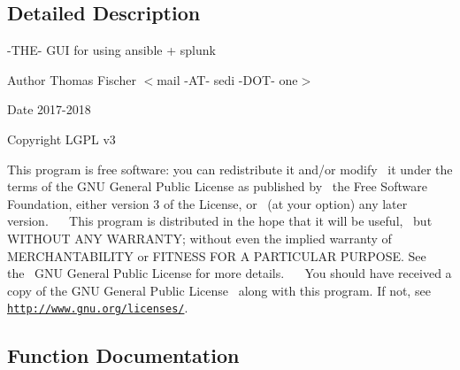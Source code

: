 \subsection{Detailed Description}
-\/\+T\+H\+E-\/ G\+UI for using ansible + splunk 

\begin{DoxyAuthor}{Author}
Thomas Fischer $<$mail -\/\+A\+T-\/ sedi -\/\+D\+O\+T-\/ one$>$ 
\end{DoxyAuthor}
\begin{DoxyDate}{Date}
2017-\/2018 
\end{DoxyDate}
\begin{DoxyCopyright}{Copyright}
L\+G\+PL v3
\end{DoxyCopyright}
This program is free software\+: you can redistribute it and/or modify~\newline
 it under the terms of the G\+NU General Public License as published by~\newline
 the Free Software Foundation, either version 3 of the License, or~\newline
 (at your option) any later version.~\newline
 ~\newline
 This program is distributed in the hope that it will be useful,~\newline
 but W\+I\+T\+H\+O\+UT A\+NY W\+A\+R\+R\+A\+N\+TY; without even the implied warranty of~\newline
 M\+E\+R\+C\+H\+A\+N\+T\+A\+B\+I\+L\+I\+TY or F\+I\+T\+N\+E\+SS F\+OR A P\+A\+R\+T\+I\+C\+U\+L\+AR P\+U\+R\+P\+O\+SE. See the~\newline
 G\+NU General Public License for more details.~\newline
 ~\newline
 You should have received a copy of the G\+NU General Public License~\newline
 along with this program. If not, see \href{http://www.gnu.org/licenses/}{\tt http\+://www.\+gnu.\+org/licenses/}. 

\subsection{Function Documentation}
\mbox{\label{ansible__engine_8sh_ae32aed87711d2842d25199eda0b2726e}} 
